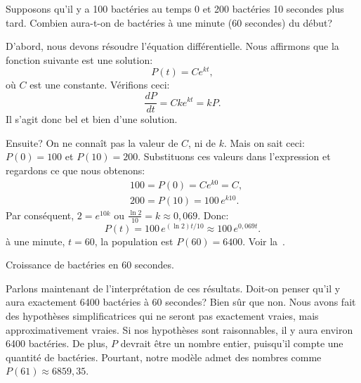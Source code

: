 \begin{example}
Supposons qu'il y a 100 bactéries au temps 0 et 200 bactéries 10 secondes plus tard.  Combien aura-t-on de bactéries à une minute (60 secondes) du début?

%
%
D'abord, nous devons résoudre l'équation différentielle.  Nous affirmons que la fonction suivante est une solution: 
\begin{equation*}
P(t) = C e^{kt}, 
\end{equation*}
où $C$ est une constante.  Vérifions ceci: 
\begin{equation*}
\frac{dP}{dt} = C k e^{kt} = k P .
\end{equation*}
Il s'agit donc bel et bien d'une solution.

Ensuite?  On ne connaît pas la valeur de $C$, ni de $k$.  Mais on sait ceci: $P(0) = 100$ et $P(10) = 200$.  
Substituons ces valeurs dans l'expression et regardons ce que nous obtenons: 
\begin{align*}
& 100 = P(0) = C e^{k0} = C ,\\
& 200 = P(10) = 100 \, e^{k10} .
\end{align*}
Par conséquent, $2 = e^{10k}$ ou $\frac{\ln 2}{10} = k \approx 0,069$.
Donc: 
\begin{equation*}
P(t) = 100 \, e^{(\ln 2) t / 10} \approx 100 \, e^{0,069 t} .
\end{equation*}
à une minute, $t=60$, la population est $P(60) = 6400$.  
Voir la~.
%
\begin{myfig}
\capstart
{}
\caption{Croissance de bactéries en 60 secondes.\label{intro:plotbactfig}}
\end{myfig}



Parlons maintenant de l'interprétation de ces résultats.  Doit-on penser qu'il y aura exactement 6400 bactéries à 60 secondes? Bien sûr que non.  Nous avons fait des hypothèses simplificatrices qui ne seront pas exactement vraies, mais approximativement vraies.  Si nos hypothèses sont raisonnables, il y aura environ 6400 bactéries.  De plus, $P$ devrait être un nombre entier, puisqu'il compte une quantité de bactéries.  Pourtant, notre modèle admet des nombres comme $P(61) \approx 6859,35$.
\end{example}

